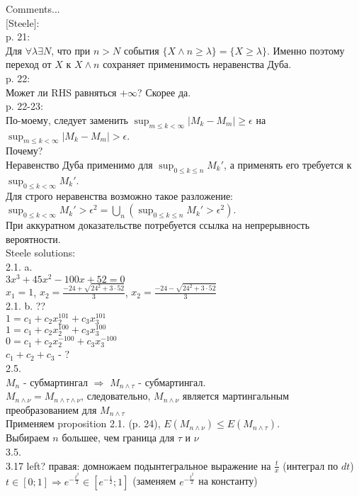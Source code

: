 Comments... \\
$[$Steele$]$: \\
p. 21: \\
Для $\forall\lambda\exists N$, что при $n>N$ события $\{X\wedge
n\ge\lambda\}=\{X\ge \lambda\}$. Именно поэтому переход от $X$ к
$X\wedge n$ сохраняет применимость неравенства Дуба. \\
p. 22: \\
Может ли RHS равняться $+\infty$? Скорее да. \\
p. 22-23: \\
По-моему, следует заменить $\sup_{m\le k<\infty}|M_{k}-M_{m}|\ge
\epsilon$ на $\sup_{m\le k<\infty}|M_{k}-M_{m}|> \epsilon$. \\
Почему? \\
Неравенство Дуба применимо для $\sup_{0\le k\le n}M_{k}{'}$, а
применять его требуется к $\sup_{0\le k<\infty}M_{k}{'}$. \\
Для строго неравенства возможно такое разложение: \\
$\sup_{0\le
k<\infty}M_{k}{'}>\epsilon^{2}=\bigcup_{n}\left(\sup_{0\le k\le
n}M_{k}{'}>\epsilon^{2}\right)$. \\
При аккуратном доказательстве потребуется ссылка на непрерывность
вероятности. \\


Steele solutions: \\
2.1. a. \\
$3x^{3}+45x^{2}-100x+52=0$ \\
$x_{1}=1$, $x_{2}=\frac{-24+\sqrt{24^{2}+3\cdot 52}}{3}$,
$x_{2}=\frac{-24-\sqrt{24^{2}+3\cdot 52}}{3}$ \\
2.1. b. ?? \\
$1=c_{1}+c_{2}x_{2}^{101}+c_{3}x_{3}^{101}$ \\
$1=c_{1}+c_{2}x_{2}^{100}+c_{3}x_{3}^{100}$ \\
$0=c_{1}+c_{2}x_{2}^{-100}+c_{3}x_{3}^{-100}$ \\
$c_{1}+c_{2}+c_{3}$ - ? \\
2.5. \\
$M_{n}$ - субмартингал $\Rightarrow$ $M_{n\wedge \tau}$ -
субмартингал. \\
$M_{n\wedge \nu}=M_{n\wedge\tau\wedge\nu}$, следовательно,
$M_{n\wedge \nu}$ является мартингальным преобразованием для
$M_{n\wedge\tau}$ \\
Применяем proposition 2.1. (p. 24), $E(M_{n\wedge \nu})\le
E(M_{n\wedge \tau})$. \\
Выбираем $n$ большее, чем граница для $\tau$ и $\nu$ \\


3.5. \\
3.17 left? правая: домножаем подынтегральное выражение на
$\frac{t}{x}$ (интеграл по $dt$) \\
 $t \in [0;1] \Rightarrow e^{-\frac{t^{2}}{2}} \in
[e^{-\frac{1}{2}};1]$ (заменяем $e^{-\frac{t^{2}}{2}}$ на константу) \\


